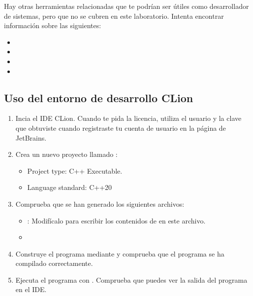 Hay otras herramientas relacionadas que te podrían ser útiles como desarrollador de sistemas,
pero que no se cubren en este laboratorio.
Intenta encontrar información sobre las siguientes:

\begin{itemize}
  \item {}
  \item {}
  \item {}
  \item {}
\end{itemize}

\subsection{Uso del entorno de desarrollo \textbf{CLion}}

\begin{enumerate}

\item
Incia el IDE CLion.
Cuando te pida la licencia, utiliza el usuario y la clave que obtuviste cuando
registraste tu cuenta de usuario en la página de JetBrains.

\item
Crea un nuevo proyecto llamado :

\begin{itemize}
  \item Project type: C++ Executable.
  \item Language standard: C++20
\end{itemize}

\item
Comprueba que se han generado los siguientes archivos:

\begin{itemize}
  \item {}: 
        Modifícalo para escribir los contenidos de  en este archivo.
  \item {}
\end{itemize}

\item
Construye el programa mediante  
y comprueba que el programa se ha compilado correctamente.

\item
Ejecuta el programa con . 
Comprueba que puedes ver la salida del programa en el IDE.

\end{enumerate}


